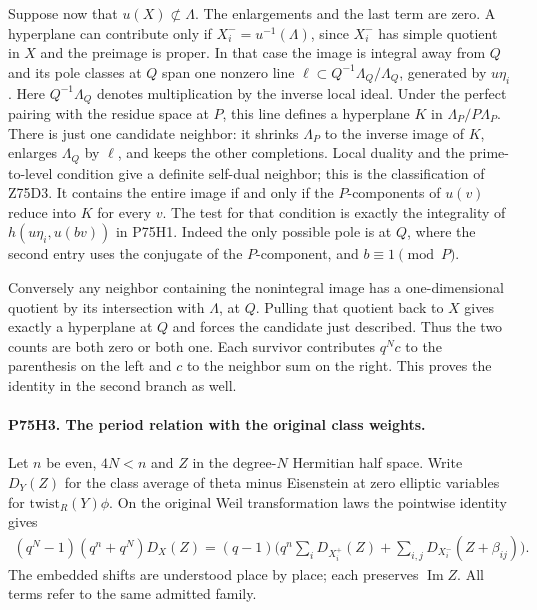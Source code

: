Suppose now that $u(X)\not\subset\Lambda$. The enlargements and
the last term are zero. A hyperplane can contribute only if
$X_i^-=u^{-1}(\Lambda)$, since $X_i^-$ has simple quotient in
$X$ and the preimage is proper. In that case the image is integral
away from $Q$ and its pole classes at $Q$ span one nonzero line
$\ell\subset Q^{-1}\Lambda_Q/\Lambda_Q$, generated by
$u\eta_i$. Here $Q^{-1}\Lambda_Q$ denotes multiplication by the
inverse local ideal. Under the perfect pairing with the residue
space at $P$, this line defines a hyperplane $K$ in
$\Lambda_P/P\Lambda_P$. There is just one candidate neighbor:
it shrinks $\Lambda_P$ to the inverse image of $K$, enlarges
$\Lambda_Q$ by $\ell$, and keeps the other completions.
Local duality and the prime-to-level condition give a definite
self-dual neighbor; this is the classification of Z75D3. It contains
the entire image if and only if the $P$-components of $u(v)$ reduce
into $K$ for every $v$. The test for that condition is exactly the
integrality of $h(u\eta_i,u(bv))$ in P75H1. Indeed the only
possible pole is at $Q$, where the second entry uses the conjugate
of the $P$-component, and $b\equiv1\pmod P$.

Conversely any neighbor containing the nonintegral image has a
one-dimensional quotient by its intersection with $\Lambda$, at
$Q$. Pulling that quotient back to $X$ gives exactly a hyperplane
at $Q$ and forces the candidate just described. Thus the two
counts are both zero or both one. Each survivor contributes $q^N c$
to the parenthesis on the left and $c$ to the neighbor sum on the
right. This proves the identity in the second branch as well.

\paragraph{P75H3. The period relation with the original class weights.}
Let $n$ be even, $4N<n$ and $Z$ in the degree-$N$ Hermitian
half space. Write $D_Y(Z)$ for the class average of theta minus
Eisenstein at zero elliptic variables for $\mathrm{twist}_R(Y)\phi$.
On the original Weil transformation laws the pointwise identity gives
\[
 \begin{split}
 (q^N-1)(q^n+q^N)D_X(Z)=(q-1)\bigg(
  q^n\sum_i D_{X_i^+}(Z)
       +\sum_{i,j}D_{X_i^-}(Z+\beta_{ij})\bigg).
 \end{split}
\]
The embedded shifts are understood place by place; each preserves
$\operatorname{Im}Z$. All terms refer to the same admitted family.

